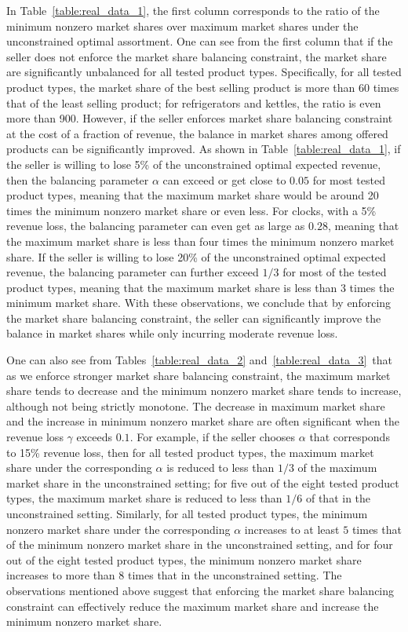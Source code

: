 \documentclass[mnsc,non-blindrev]{informs3}
\theoremstyle{definition}
\begin{document}
{In Table~\ref{table:real_data_1}, the first column corresponds to the ratio of the minimum nonzero market shares over maximum market shares under the unconstrained optimal assortment. One can see from the first column that if the seller does not enforce the market share balancing constraint, the market share are significantly unbalanced for all tested product types. Specifically, for all tested product types, the market share of the best selling product is more than 60 times that of the least selling product; for refrigerators and kettles, the ratio is even more than 900. However, if the seller enforces market share balancing constraint at the cost of a fraction of revenue, the balance in market shares among offered products can be significantly improved. As shown in Table~\ref{table:real_data_1}, if the seller is willing to lose 5\% of the unconstrained optimal expected revenue, then the balancing parameter $\alpha$ can exceed or get close to $0.05$ for most tested product types, meaning that the maximum market share would be around 20 times the minimum nonzero market share or even less. For clocks, with a 5\% revenue loss, the balancing parameter can even get as large as $0.28$, meaning that the maximum market share is less than four times the minimum nonzero market share. If the seller is willing to lose 20\% of the unconstrained optimal expected revenue, the balancing parameter can further exceed $1/3$ for most of the tested product types, meaning that the maximum market share is less than 3 times the minimum market share. With these observations, we conclude that by enforcing the market share balancing constraint, the seller can significantly improve the balance in market shares while only incurring moderate revenue loss. 

One can also see from Tables~\ref{table:real_data_2} and~\ref{table:real_data_3}~that as we enforce stronger market share balancing constraint, the maximum market share tends to decrease and the minimum nonzero market share tends to increase, although not being strictly monotone. The decrease in maximum market share and the increase in minimum nonzero market share are often significant when the revenue loss $\gamma$ exceeds $0.1$. For example, if the seller chooses $\alpha$ that corresponds to 15\% revenue loss, then for all tested product types, the maximum market share under the corresponding $\alpha$ is reduced to less than $1/3$ of the maximum market share in the unconstrained setting; for five out of the eight tested product types, the maximum market share is reduced to less than $1/6$ of that in the unconstrained setting. Similarly, for all tested product types, the minimum nonzero market share under the corresponding $\alpha$ increases to at least $5$ times that of the minimum nonzero market share in the unconstrained setting, and for four out of the eight tested product types, the minimum nonzero market share increases to more than $8$ times that in the unconstrained setting. The observations mentioned above suggest that enforcing the market share balancing constraint can effectively reduce the maximum market share and increase the minimum nonzero market share.

}
\end{document}
